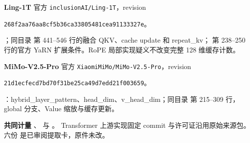 \documentclass[UTF8,a4paper,11pt]{ctexart}
\newcommand{\para}[1]{\par\textbf{#1}\quad}
\begin{document}
\para{Ling-1T} 官方 \texttt{inclusionAI/Ling-1T}，revision\par
\texttt{268f2aa76aa8cf5b36ca33805481cea91133327e}。\par
{}；同目录  第 441--546 行的融合 QKV、cache update 和 repeat\_kv； 第 238--250 行的官方 YaRN 扩展条件。RoPE 局部实现疑义不改变完整 128 维缓存计数。

\para{MiMo-V2.5-Pro} 官方 \texttt{XiaomiMiMo/MiMo-V2.5-Pro}，revision\par
\texttt{21d1ecfecd7bd70f31be25ca49d7edd21f003659}。\par
{}：hybrid\_layer\_pattern、head\_dim、v\_head\_dim；同目录  第 215--309 行，global 分支、Value 缩放与缓存更新。

\para{共同计量} 、 与 。
Transformer 上游实现固定 commit 与许可证沿用原始来源包。六份  是已审阅提取卡，原件未改。
\end{document}
